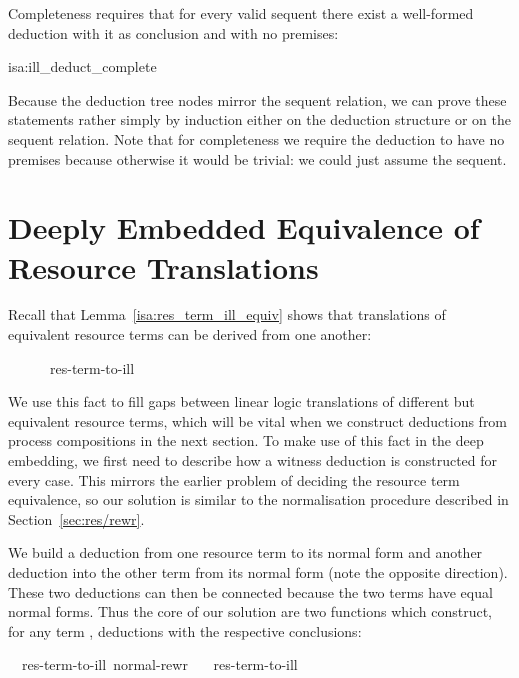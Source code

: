 \documentclass[class=smolathesis,crop=false]{standalone}
\begin{document}
\noindent
Completeness requires that for every valid sequent there exist a well-formed deduction with it as conclusion and with no premises:
\pagebreak
\begin{isalemma}{isa:ill_deduct_complete}
  
\end{isalemma}

Because the deduction tree nodes mirror the sequent relation, we can prove these statements rather simply by induction either on the deduction structure or on the sequent relation.
Note that for completeness we require the deduction to have no premises because otherwise it would be trivial: we could just assume the sequent.

\section{Deeply Embedded Equivalence of Resource Translations}
\label{sec:linearity/equiv}

Recall that Lemma~\ref{isa:res_term_ill_equiv} shows that translations of equivalent resource terms can be derived from one another:
\begin{isabelle}
\centering
  \ \isasymsim\ \ \isasymLongrightarrow\ \ \isasymturnstile\ res-term-to-ill\ 
\end{isabelle}

We use this fact to fill gaps between linear logic translations of different but equivalent resource terms, which will be vital when we construct deductions from process compositions in the next section.
To make use of this fact in the deep embedding, we first need to describe how a witness deduction is constructed for every case.
This mirrors the earlier problem of deciding the resource term equivalence, so our solution is similar to the normalisation procedure described in Section~\ref{sec:res/rewr}.

We build a deduction from one resource term to its normal form and another deduction into the other term from its normal form (note the opposite direction).
These two deductions can then be connected because the two terms have equal normal forms.
Thus the core of our solution are two functions which construct, for any term , deductions with the respective conclusions:
\begin{isabelle}
\centering
  \ \isasymturnstile\ res-term-to-ill\ \isacharparenleft normal-rewr\ \isacharparenright\isanewline%
  \ \isasymturnstile\ res-term-to-ill\ 
\end{isabelle}
\end{document}
